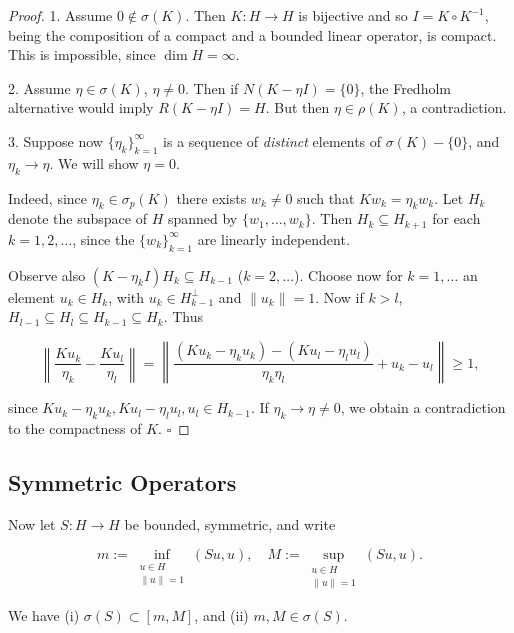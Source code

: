 \begin{proof}
1. Assume $0 \notin \sigma(K)$. Then $K : H \to H$ is bijective and so $I = K \circ K^{-1}$, being the composition of a compact and a bounded linear operator, is compact. This is impossible, since $\dim H = \infty$.

2. Assume $\eta \in \sigma(K)$, $\eta \neq 0$. Then if $N(K - \eta I) = \{0\}$, the Fredholm alternative would imply $R(K - \eta I) = H$. But then $\eta \in \rho(K)$, a contradiction.

3. Suppose now $\{\eta_k\}_{k=1}^{\infty}$ is a sequence of \textit{distinct} elements of $\sigma(K) - \{0\}$, and $\eta_k \to \eta$. We will show $\eta = 0$.

Indeed, since $\eta_k \in \sigma_p(K)$ there exists $w_k \neq 0$ such that $Kw_k = \eta_k w_k$. Let $H_k$ denote the subspace of $H$ spanned by $\{w_1, \ldots, w_k\}$. Then $H_k \subseteq H_{k+1}$ for each $k = 1, 2, \ldots$, since the $\{w_k\}_{k=1}^{\infty}$ are linearly independent.

Observe also $(K - \eta_k I) H_k \subseteq H_{k-1}$ ($k = 2, \ldots$). Choose now for $k = 1, \ldots$ an element $u_k \in H_k$, with $u_k \in H_{k-1}^{\perp}$ and $\|u_k\| = 1$. Now if $k > l$, $H_{l-1} \subseteq H_l \subseteq H_{k-1} \subseteq H_k$. Thus

$$\left\| \frac{Ku_k}{\eta_k} - \frac{Ku_l}{\eta_l} \right\| = \left\| \frac{(Ku_k - \eta_k u_k) - (Ku_l - \eta_l u_l)}{\eta_k \eta_l} + u_k - u_l \right\| \geq 1,$$

since $Ku_k - \eta_k u_k, Ku_l - \eta_l u_l, u_l \in H_{k-1}$. If $\eta_k \to \eta \neq 0$, we obtain a contradiction to the compactness of $K$. $\square$
\end{proof}

\subsection{Symmetric Operators}
\label{sec:symmetric-operators}

Now let $S : H \to H$ be bounded, symmetric, and write

$$m := \inf_{\substack{u \in H \\ \|u\| = 1}} (Su, u), \quad M := \sup_{\substack{u \in H \\ \|u\| = 1}} (Su, u).$$

\begin{lemma}
\label{lem:bounds-on-spectrum-symmetric-operator}
We have
(i) $\sigma(S) \subset [m, M]$, and
(ii) $m, M \in \sigma(S)$.
\end{lemma}

